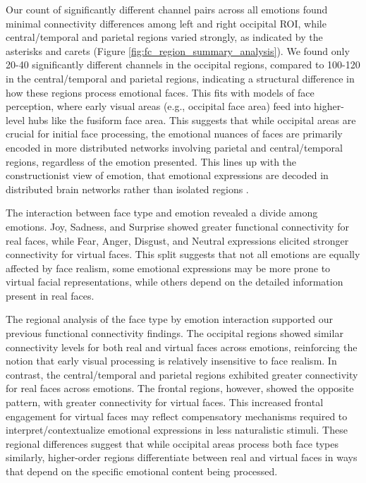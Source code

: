 Our count of significantly different channel pairs across all emotions found minimal connectivity differences among left and right occipital ROI, while central/temporal and parietal regions varied strongly, as indicated by the asterisks and carets (Figure \ref{fig:fc_region_summary_analysis}).
We found only 20-40 significantly different channels in the occipital regions, compared to 100-120 in the central/temporal and parietal regions, indicating a structural difference in how these regions process emotional faces.
This fits with models of face perception, where early visual areas (e.g., occipital face area) feed into higher-level hubs like the fusiform face area. 
This suggests that while occipital areas are crucial for initial face processing, the emotional nuances of faces are primarily encoded in more distributed networks involving parietal and central/temporal regions, regardless of the emotion presented.
This lines up with the constructionist view of emotion, that emotional expressions are decoded in distributed brain networks rather than isolated regions \citep{barrett_solving_2006}. 

The interaction between face type and emotion revealed a divide among emotions. 
Joy, Sadness, and Surprise showed greater functional connectivity for real faces, while Fear, Anger, Disgust, and Neutral expressions elicited stronger connectivity for virtual faces. 
This split suggests that not all emotions are equally affected by face realism, some emotional expressions may be more prone to virtual facial representations, while others depend on the detailed information present in real faces.

The regional analysis of the face type by emotion interaction supported our previous functional connectivity findings. 
The occipital regions showed similar connectivity levels for both real and virtual faces across emotions, reinforcing the notion that early visual processing is relatively insensitive to face realism.
In contrast, the central/temporal and parietal regions exhibited greater connectivity for real faces across emotions. 
The frontal regions, however, showed the opposite pattern, with greater connectivity for virtual faces.
This increased frontal engagement for virtual faces may reflect compensatory mechanisms required to interpret/contextualize emotional expressions in less naturalistic stimuli.
These regional differences suggest that while occipital areas process both face types similarly, higher-order regions differentiate between real and virtual faces in ways that depend on the specific emotional content being processed.

